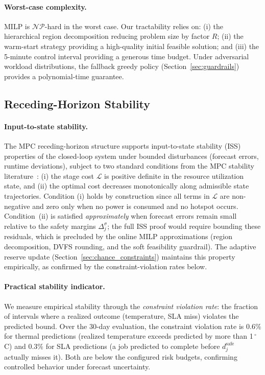\documentclass[a4paper,fleqn]{cas-dc}
\begin{document}
\paragraph{Worst-case complexity.}
MILP is $\mathcal{NP}$-hard in the worst case. Our tractability relies on: (i) the hierarchical region decomposition reducing problem size by factor $R$; (ii) the warm-start strategy providing a high-quality initial feasible solution; and (iii) the 5-minute control interval providing a generous time budget. Under adversarial workload distributions, the fallback greedy policy (Section~\ref{sec:guardrails}) provides a polynomial-time guarantee.

\subsection{Receding-Horizon Stability}
\label{sec:stability}

\paragraph{Input-to-state stability.}
The MPC receding-horizon structure supports input-to-state stability (ISS) properties of the closed-loop system under bounded disturbances (forecast errors, runtime deviations), subject to two standard conditions from the MPC stability literature~\cite{ref-mayne00}: (i) the stage cost $\mathcal{L}$ is positive definite in the resource utilization state, and (ii) the optimal cost decreases monotonically along admissible state trajectories. Condition (i) holds by construction since all terms in $\mathcal{L}$ are non-negative and zero only when no power is consumed and no hotspot occurs. Condition~(ii) is satisfied \emph{approximately} when forecast errors remain small relative to the safety margins $\Delta^\sigma_j$; the full ISS proof would require bounding these residuals, which is precluded by the online MILP approximations (region decomposition, DVFS rounding, and the soft feasibility guardrail). The adaptive reserve update (Section~\ref{sec:chance_constraints}) maintains this property empirically, as confirmed by the constraint-violation rates below.

\paragraph{Practical stability indicator.}
We measure empirical stability through the \emph{constraint violation rate}: the fraction of intervals where a realized outcome (temperature, SLA miss) violates the predicted bound. Over the 30-day evaluation, the constraint violation rate is 0.6\% for thermal predictions (realized temperature exceeds predicted by more than 1$\,^\circ$C) and 0.3\% for SLA predictions (a job predicted to complete before $d^{\mathrm{safe}}_j$ actually misses it). Both are below the configured risk budgets, confirming controlled behavior under forecast uncertainty.
\end{document}

